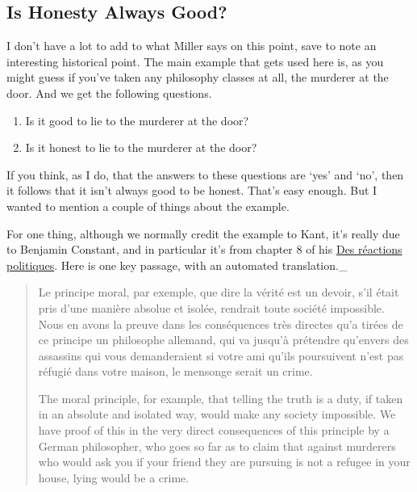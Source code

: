 \documentclass[
]{article}
\providecommand{\tightlist}{%
  \setlength{\itemsep}{0pt}\setlength{\parskip}{0pt}}
\begin{document}
\hypertarget{is-honesty-always-good}{%
\subsection{Is Honesty Always Good?}\label{is-honesty-always-good}}

I don't have a lot to add to what Miller says on this point, save to
note an interesting historical point. The main example that gets used
here is, as you might guess if you've taken any philosophy classes at
all, the murderer at the door. And we get the following questions.

\begin{enumerate}
\def\labelenumi{\arabic{enumi}.}
\tightlist
\item
  Is it good to lie to the murderer at the door?
\item
  Is it honest to lie to the murderer at the door?
\end{enumerate}

If you think, as I do, that the answers to these questions are `yes' and
`no', then it follows that it isn't always good to be honest. That's
easy enough. But I wanted to mention a couple of things about the
example.

For one thing, although we normally credit the example to Kant, it's
really due to Benjamin Constant, and in particular it's from chapter 8
of his
\href{http://classiques.uqac.ca/classiques/constant_benjamin/des_reactions_politiques/reactions_politiques.doc\#des_réactions_chap_08}{Des
réactions politiques}. Here is one key passage, with an automated
translation.\_

\begin{quote}
Le principe moral, par exemple, que dire la vérité est un devoir, s'il
était pris d'une manière absolue et isolée, rendrait toute société
impossible. Nous en avons la preuve dans les conséquences très directes
qu'a tirées de ce principe un philosophe allemand, qui va jusqu'à
prétendre qu'envers des assassins qui vous demanderaient si votre ami
qu'ils poursuivent n'est pas réfugié dans votre maison, le mensonge
serait un crime.

The moral principle, for example, that telling the truth is a duty, if
taken in an absolute and isolated way, would make any society
impossible. We have proof of this in the very direct consequences of
this principle by a German philosopher, who goes so far as to claim that
against murderers who would ask you if your friend they are pursuing is
not a refugee in your house, lying would be a crime.
\end{quote}
\end{document}
